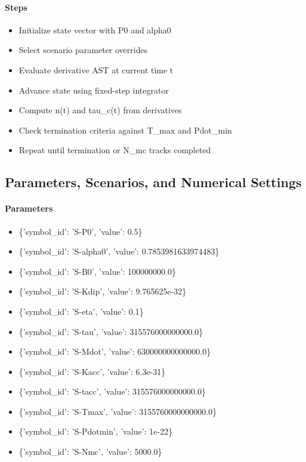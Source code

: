 \documentclass[11pt]{article}
\begin{document}
\paragraph{Steps}
\begin{itemize}
\item Initialize state vector with P0 and alpha0
\item Select scenario parameter overrides
\item Evaluate derivative AST at current time t
\item Advance state using fixed-step integrator
\item Compute n(t) and tau\_c(t) from derivatives
\item Check termination criteria against T\_max and Pdot\_min
\item Repeat until termination or N\_mc tracks completed
\end{itemize}

\subsection{Parameters, Scenarios, and Numerical Settings}

\paragraph{Parameters}
\begin{itemize}
\item \{'symbol\_id': 'S-P0', 'value': 0.5\}
\item \{'symbol\_id': 'S-alpha0', 'value': 0.7853981633974483\}
\item \{'symbol\_id': 'S-B0', 'value': 100000000.0\}
\item \{'symbol\_id': 'S-Kdip', 'value': 9.765625e-32\}
\item \{'symbol\_id': 'S-eta', 'value': 0.1\}
\item \{'symbol\_id': 'S-tau', 'value': 315576000000000.0\}
\item \{'symbol\_id': 'S-Mdot', 'value': 630000000000000.0\}
\item \{'symbol\_id': 'S-Kacc', 'value': 6.3e-31\}
\item \{'symbol\_id': 'S-tacc', 'value': 315576000000000.0\}
\item \{'symbol\_id': 'S-Tmax', 'value': 3155760000000000.0\}
\item \{'symbol\_id': 'S-Pdotmin', 'value': 1e-22\}
\item \{'symbol\_id': 'S-Nmc', 'value': 5000.0\}
\end{itemize}
\end{document}
